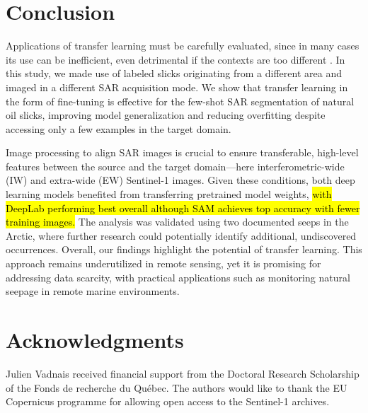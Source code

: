 \documentclass[journal]{IEEEtran}
\begin{document}
\section{Conclusion}
Applications of transfer learning must be carefully evaluated, since in many cases its use can be inefficient, even detrimental if the contexts are too different \cite{mensinkFactorsInfluenceTransfer2022}.
In this study, we made use of labeled slicks originating from a different area and imaged in a different SAR acquisition mode. 
We show that transfer learning in the form of fine-tuning is effective for the few-shot SAR segmentation of natural oil slicks, improving model generalization and reducing overfitting 
despite accessing only a few examples in the target domain.

Image processing to align SAR images is crucial to ensure transferable, high-level features between the source and the target domain—here interferometric-wide (IW) and extra-wide (EW) Sentinel-1 images.
Given these conditions, both deep learning models benefited from transferring pretrained model weights, \hl{with DeepLab performing best overall although SAM achieves top accuracy with fewer training images.} 
The analysis was validated using two documented seeps in the Arctic, where further research could potentially identify additional, undiscovered occurrences. 
Overall, our findings highlight the potential of transfer learning. This approach remains underutilized in remote sensing, yet it is promising for addressing data scarcity, 
with practical applications such as monitoring natural seepage in remote marine environments. 

\section*{Acknowledgments}
Julien Vadnais received financial support from the Doctoral Research Scholarship of the Fonds de recherche du Québec. 
The authors would like to thank the EU Copernicus programme for allowing open access to the Sentinel-1 archives.



\end{document}
